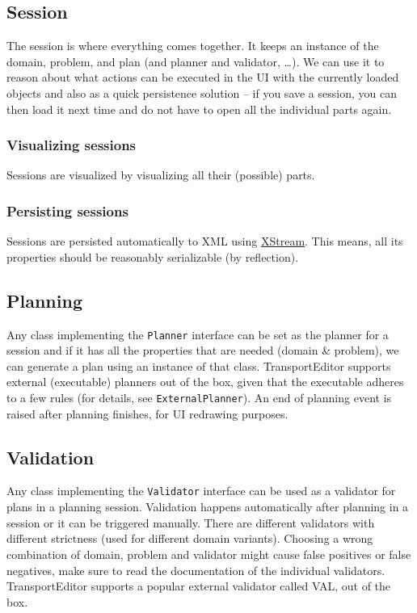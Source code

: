\subsection*{Session}
The session is where everything comes together. It keeps an instance of the domain, problem, and plan (and planner and
validator, \ldots). We can use it to reason about what actions can be executed in the UI with the currently loaded
objects and also as a quick persistence solution -- if you save a session, you can then load it next time and
do not have to open all the individual parts again.

\subsubsection*{Visualizing sessions}

Sessions are visualized by visualizing all their (possible) parts.

\subsubsection*{Persisting sessions}
Sessions are persisted automatically to XML using \href{https://x-stream.github.io/}{XStream}. This means, all its properties
should be reasonably serializable (by reflection).

\subsection*{Planning}
Any class implementing the \texttt{Planner} interface can be set as the planner for a session and if it has all the properties
that are needed (domain \& problem), we can generate a plan using an instance of that class. TransportEditor supports
external (executable) planners out of the box, given that the executable adheres to a few rules (for details, see
\texttt{ExternalPlanner}). An end of planning event is raised after planning finishes, for UI redrawing purposes.

\subsection*{Validation}
Any class implementing the \texttt{Validator} interface can be used as a validator for plans in a planning session.
Validation happens automatically after planning in a session or it can be triggered manually. There are different
validators with different strictness (used for different domain variants). Choosing a wrong combination of domain,
problem and validator might cause false positives or false negatives, make sure to read the documentation of the
individual validators. TransportEditor supports a popular external validator called VAL, out of the box.

